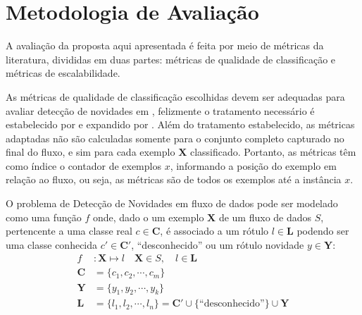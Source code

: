 \section{Metodologia de Avaliação}\label{sec:avaliacao}


A avaliação da proposta aqui apresentada é feita por meio de métricas da
literatura, divididas em duas partes: métricas de qualidade de classificação
e métricas de escalabilidade.

As métricas de qualidade de classificação escolhidas devem ser adequadas para
avaliar detecção de novidades em \streams, felizmente o tratamento necessário é
estabelecido por  e expandido por
.
Além do tratamento estabelecido, as métricas adaptadas não são calculadas
somente para o conjunto completo capturado no final do fluxo, e sim para cada
exemplo $\mathbf{X}$ classificado.
Portanto, as métricas têm como índice o contador de exemplos $x$, informando a
posição do exemplo em relação ao fluxo, ou seja, as métricas são de todos os
exemplos até a instância $x$.

\begin{definition}
  O problema de Detecção de Novidades em fluxo de dados pode ser modelado como
  uma função $f$ onde, dado o um exemplo $\mathbf{X}$ de um fluxo de dados $S$,
  pertencente a uma classe real $c \in \mathbf{C}$, é associado a um rótulo $l
  \in \mathbf{L}$ podendo ser uma classe conhecida $c' \in \mathbf{C}'$, ``desconhecido''
  ou um rótulo novidade $y \in \mathbf{Y}$:
  \begin{align}
    f  &: \mathbf{X} \mapsto l  \quad \mathbf{X} \in S , \quad l \in \mathbf{L}\\
    \mathbf{C} &= \{ c_1, c_2, \cdots, c_m \}  \label{eq:classes} \\
    \mathbf{Y} &= \{ y_1, y_2, \cdots, y_k \}  \label{eq:novelies} \\
    \mathbf{L} &= \{ l_1, l_2, \cdots, l_n \} = \mathbf{C}' \cup \{ \text{``desconhecido''} \} \cup \mathbf{Y} \label{eq:labels} 
  \end{align}
\end{definition}


